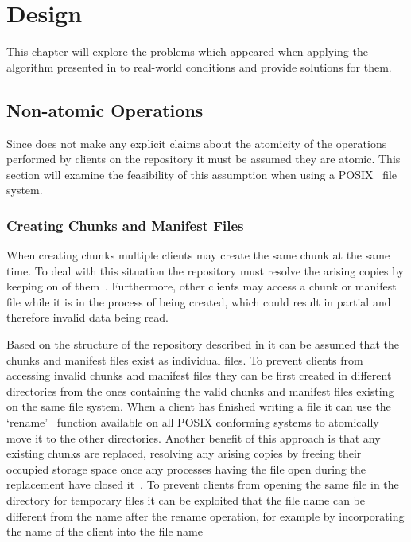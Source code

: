 \chapter{Design}\label{ch:design}

This chapter will explore the problems which appeared when applying the algorithm
presented in  to real-world conditions and provide solutions
for them.

\section{Non-atomic Operations}

Since \cite{Duplicacy} does not make any explicit claims about the atomicity of
the operations performed by clients on the repository it must be assumed they are atomic.
This section will examine the feasibility of this assumption when using a POSIX~\cite{Posix}
file system.

\subsection{Creating Chunks and Manifest Files}\label{sec:creation}

When creating chunks multiple clients may create the same chunk at the same time.
To deal with this situation the repository must resolve the arising copies by
keeping on of them~\cite[Theorem 1]{Duplicacy}.
Furthermore, other clients may access a chunk or manifest file while it is in the
process of being created, which could result in partial and therefore invalid
data being read.

Based on the structure of the repository described in \cite[section `Naming Chunks']{Duplicacy}
it can be assumed that the chunks and manifest files exist as individual files.
To prevent clients from accessing invalid chunks and manifest files they can be first
created in different directories from the ones containing the valid chunks and manifest
files existing on the same file system.
When a client has finished writing a file it can use the `rename'~\cite{Posix}
function available on all POSIX conforming systems to atomically move it to the
other directories.
Another benefit of this approach is that any existing chunks are replaced,
resolving any arising copies by freeing their occupied storage space once any
processes having the file open during the replacement have closed
it~\cite[function `rename', section `DESCRIPTION']{Posix}.
To prevent clients from opening the same file in the directory for temporary files
it can be exploited that the file name can be different from the name after
the rename operation, for example by incorporating the name of the client into the file name

